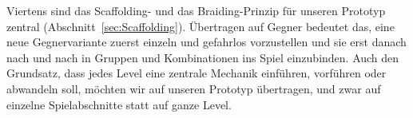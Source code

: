 \documentclass[../Main.tex]{subfiles}
\begin{document}
Viertens sind das Scaffolding- und das Braiding-Prinzip für unseren Prototyp zentral (Abschnitt~\ref{sec:Scaffolding}). Übertragen auf Gegner bedeutet das, eine neue Gegnervariante zuerst einzeln und gefahrlos vorzustellen und sie erst danach nach und nach in Gruppen und Kombinationen ins Spiel einzubinden. Auch den Grundsatz, dass jedes Level eine zentrale Mechanik einführen, vorführen oder abwandeln soll, möchten wir auf unseren Prototyp übertragen, und zwar auf einzelne Spielabschnitte statt auf ganze Level.
\end{document}
